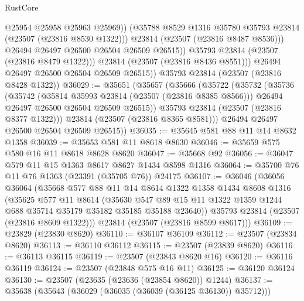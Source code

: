 \begin{lexlean}{RustCore}
\begin{coremodule}
                      @25954
                      @25958
                      @25963
                      @25969))
                  (@35788 @8529 @1316 @35780 @35793 @23814 (@23507 (@23816 @8530 @1322)))
                  @23814
                  (@23507 (@23816 @8487 @8536)))
                @26494
                @26497
                @26500
                @26504
                @26509
                @26515))
            @35793
            @23814
            (@23507 (@23816 @8479 @1322)))
          @23814
          (@23507 (@23816 @8436 @8551)))
        @26494
        @26497
        @26500
        @26504
        @26509
        @26515))
    @35793
    @23814
    (@23507 (@23816 @8428 @1322))
@36029 := @35651
    (@35657
      (@35666
        (@35722
          (@35732
            (@35736
              (@35742
                (@35814 @35993 @23814 (@23507 (@23816 @8385 @8566)))
                @26494
                @26497
                @26500
                @26504
                @26509
                @26515))
            @35793
            @23814
            (@23507 (@23816 @8377 @1322)))
          @23814
          (@23507 (@23816 @8365 @8581)))
        @26494
        @26497
        @26500
        @26504
        @26509
        @26515))
@36035 := @35645 @581 @88 @11 @14 @8632 @1358
@36039 := @35653 @581 @11 @8618 @8630
@36046 := @35659 @575 @580 @16 @11 @8618 @8628 @8620
@36047 := @35668 @92
@36056 := @36047 @579 @11 @15 @1363 @8617 @8627 @1434 @8598 @1316
@36064 := @35700 @76 @11 @76 @1363 (@23391 (@35705 @76)) @24175
@36107 := @36046
    (@36056
      @36064
      (@35668
        @577
        @88
        @11
        @14
        @8614
        @1322
        @1358
        @1434
        @8608
        @1316
        (@35625
          @577
          @11
          @8614
          (@35630
            @547
            @89
            @15
            @11
            @1322
            @1359
            @1244
            @688
            @35714
            @35179
            @35182
            @35185
            @35188
            @23640))
        @35793
        @23814
        (@23507 (@23816 @8609 @1322)))
      @23814
      (@23507 (@23816 @8599 @8617)))
@36109 := @23829 (@23830 @8620)
@36110 := @36107 @36109
@36112 := @23507 (@23834 @8620)
@36113 := @36110 @36112
@36115 := @23507 (@23839 @8620)
@36116 := @36113 @36115
@36119 := @23507 (@23843 @8620 @16)
@36120 := @36116 @36119
@36124 := @23507 (@23848 @575 @16 @11)
@36125 := @36120 @36124
@36130 := @23507 (@23635 (@23636 (@23854 @8620)) @1244)
@36137 := @35638 (@35643 (@36029 (@36035 (@36039 (@36125 @36130)) @35712)))

\end{coremodule}
\end{lexlean}
